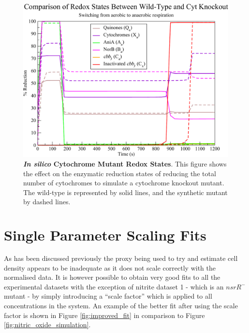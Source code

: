 \begin{figure}[tbp]
 \centering
 \includegraphics[width=15cm, clip=true]{./09-completedmodel/data/in_silico_cyt_redox.pdf}
 \caption[In Silico Cytochrome Mutant Redox States]{{\bf \textit{In silico} Cytochrome Mutant Redox States}. This figure shows the effect on the enzymatic reduction states of reducing the total number of cytochromes to simulate a cytochrome knockout mutant. The wild-type is represented by solid lines, and the synthetic mutant by dashed lines.
 \label{fig:in_silico_cyt_redox}}
\end{figure}

%

\section{Single Parameter Scaling Fits}
As has been discussed previously the proxy being used to try and estimate cell density appears to be inadequate as it does not scale correctly with the normalised data. It is however possible to obtain very good fits to all the experimental datasets with the exception of nitrite dataset 1 -  which is an $nsrR^-$ mutant - by simply introducing a ``scale factor'' which is applied to all concentrations in the system. An example of the better fit after using the scale factor is shown in Figure \ref{fig:improved_fit} in comparison to Figure \ref{fig:nitric_oxide_simulation}.

